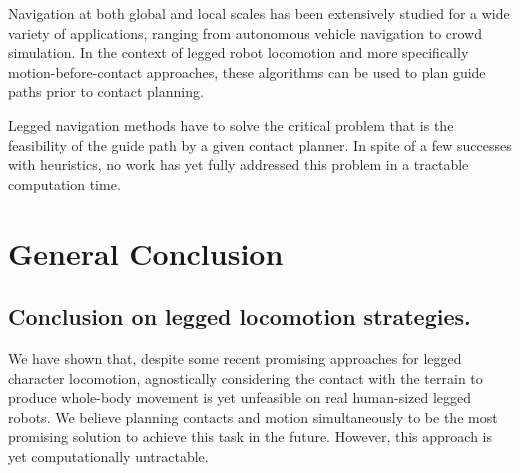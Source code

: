 Navigation at both global and local scales has been extensively studied for a wide variety of applications, ranging from autonomous vehicle navigation to crowd simulation.
In the context of legged robot locomotion and more specifically motion-before-contact approaches, these algorithms can be used to plan guide paths prior to contact planning.

Legged navigation methods have to solve the critical problem that is the feasibility of the guide path by a given contact planner.
In spite of a few successes with heuristics, no work has yet fully addressed this problem in a tractable computation time.






\section{General Conclusion \label{sota4}}
\subsection{Conclusion on legged locomotion strategies.}
We have shown that, despite some recent promising approaches for legged character locomotion, agnostically considering the contact with the terrain to produce whole-body movement is yet unfeasible on real human-sized legged robots.
We believe planning contacts and motion simultaneously to be the most promising solution to achieve this task in the future. However, this approach is yet computationally untractable.

